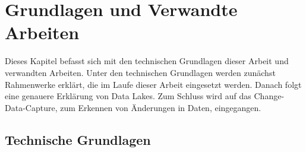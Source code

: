 \chapter{Grundlagen und Verwandte Arbeiten}

Dieses Kapitel befasst sich mit den technischen Grundlagen dieser Arbeit und verwandten Arbeiten.
Unter den technischen Grundlagen werden zunächst Rahmenwerke erklärt, die im Laufe dieser Arbeit eingesetzt werden.
Danach folgt eine genauere Erklärung von Data Lakes.
Zum Schluss wird auf das Change-Data-Capture, zum Erkennen von Änderungen in Daten, eingegangen.

\section{Technische Grundlagen}






